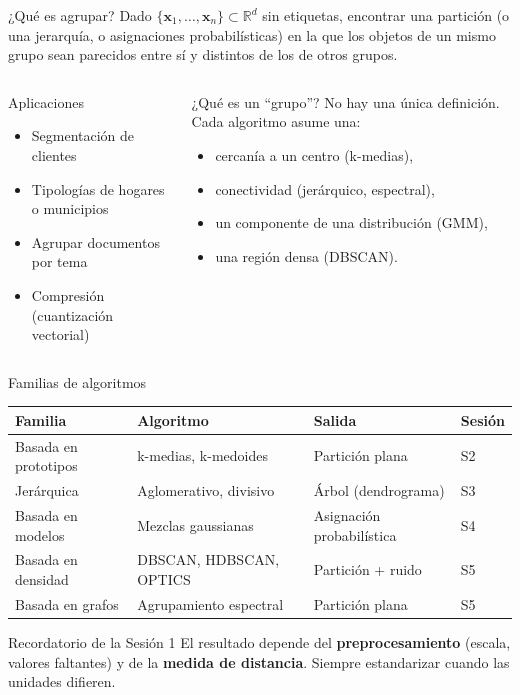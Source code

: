 \documentclass[aspectratio=169,11pt]{beamer}
\newcommand{\R}{\mathbb{R}}
\newcommand{\x}{\bm{x}}
\begin{document}
\begin{frame}{¿Qué es agrupar?}
  Dado $\{\x_1,\dots,\x_n\}\subset\R^d$ sin etiquetas, encontrar una partición (o una
  jerarquía, o asignaciones probabilísticas) en la que los objetos de un mismo grupo
  sean \alert{parecidos} entre sí y \alert{distintos} de los de otros grupos.
  \vspace{6pt}
  \begin{columns}[T]
    \begin{block}{Aplicaciones}
      \begin{itemize}
        \item Segmentación de clientes
        \item Tipologías de hogares o municipios
        \item Agrupar documentos por tema
        \item Compresión (cuantización vectorial)
      \end{itemize}
    \end{block}
    \begin{alertblock}{¿Qué es un ``grupo''?}
      No hay una única definición. Cada algoritmo asume una:
      \begin{itemize}
        \item cercanía a un centro (k-medias),
        \item conectividad (jerárquico, espectral),
        \item un componente de una distribución (GMM),
        \item una región densa (DBSCAN).
      \end{itemize}
    \end{alertblock}
  \end{columns}
\end{frame}

\begin{frame}{Familias de algoritmos}
  \centering
  \renewcommand{\arraystretch}{1.25}
  \begin{tabular}{@{}llll@{}}
    \toprule
    \textbf{Familia} & \textbf{Algoritmo} & \textbf{Salida} & \textbf{Sesión}\\
    \midrule
    Basada en prototipos & k-medias, k-medoides & Partición plana & S2 \\
    Jerárquica           & Aglomerativo, divisivo & Árbol (dendrograma) & S3 \\
    Basada en modelos    & Mezclas gaussianas & Asignación probabilística & S4 \\
    Basada en densidad   & DBSCAN, HDBSCAN, OPTICS & Partición + ruido & S5 \\
    Basada en grafos     & Agrupamiento espectral & Partición plana & S5 \\
    \bottomrule
  \end{tabular}
  \vspace{8pt}
  \begin{block}{Recordatorio de la Sesión 1}
    El resultado depende del \textbf{preprocesamiento} (escala, valores faltantes) y de la
    \textbf{medida de distancia}. Siempre estandarizar cuando las unidades difieren.
  \end{block}
\end{frame}
\end{document}
